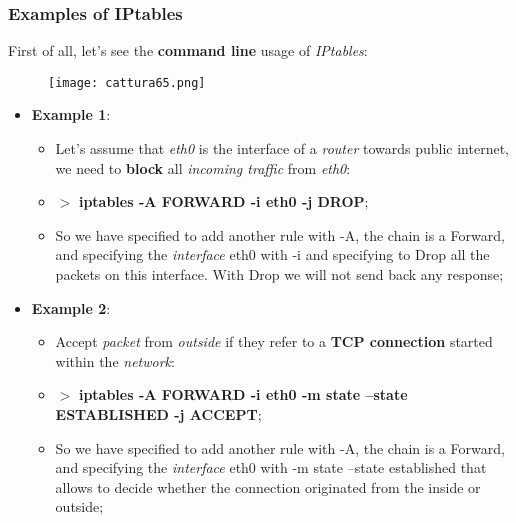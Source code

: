 \documentclass{article}
\begin{document}
\subsubsection{Examples of IPtables}
First of all, let’s see the \textbf{command line} usage of \emph{IPtables}:
\begin{figure}[H]
  \centering
  \texttt{[image: cattura65.png]}
\end{figure}
\begin{itemize}
\item \textbf{Example 1}:
\begin{itemize}
\item Let's assume that \emph{eth0} is the interface of a \emph{router} towards public internet, we need to \textbf{block} all \emph{incoming traffic} from \emph{eth0}:
\item $>$ \textbf{iptables -A FORWARD -i eth0 -j DROP};
\item So we have specified to add another rule with -A, the chain is a Forward, and specifying the \emph{interface} eth0 with -i and specifying to Drop all the packets on this interface. With Drop we will not send back any response;
\end{itemize}
\item \textbf{Example 2}:
\begin{itemize}
\item Accept \emph{packet} from \emph{outside} if they refer to a \textbf{TCP connection} started within the \emph{network}:
\item $>$ \textbf{iptables -A FORWARD -i eth0 -m state --state ESTABLISHED -j ACCEPT};
\item So we have specified to add another rule with -A, the chain is a Forward, and specifying the \emph{interface} eth0 with -m state --state established that allows to decide whether the connection  originated from the inside or outside;
\end{itemize}
\end{itemize}
\end{document}

